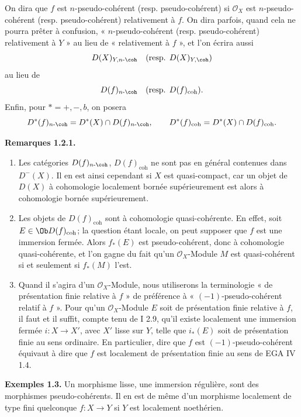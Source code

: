 \documentclass[11pt]{article}
\begin{document}
On dira que \(f\) est \(n\)-pseudo-cohérent (resp. pseudo-cohérent) si \(\mathcal O_X\) est \(n\)-pseudo-cohérent (resp. pseudo-cohérent) relativement à \(f\). On dira parfois, quand cela ne pourra prêter à confusion, « \(n\)-pseudo-cohérent (resp. pseudo-cohérent) relativement à \(Y\) » au lieu de « relativement à \(f\) », et l'on écrira aussi
\[
  D(X)_{Y,n\text{-}\coh}\quad(\text{resp. }D(X)_{Y,\coh})
\]
au lieu de
\[
  D(f)_{n\text{-}\coh}\quad(\text{resp. }D(f)_{\mathrm{coh}}).
\]
Enfin, pour \(*=+,-,b\), on posera
\[
  D^*(f)_{n\text{-}\coh}=D^*(X)\cap D(f)_{n\text{-}\coh},
  \qquad
  D^*(f)_{\mathrm{coh}}=D^*(X)\cap D(f)_{\mathrm{coh}}.
\]

\textbf{Remarques 1.2.1.}
\begin{enumerate}[label=\alph*)]
\item Les catégories \(D(f)_{n\text{-}\coh}\), \(D(f)_{\mathrm{coh}}\) ne sont pas en général contenues dans \(D^{-}(X)\). Il en est ainsi cependant si \(X\) est quasi-compact, car un objet de \(D(X)\) à cohomologie localement bornée supérieurement est alors à cohomologie bornée supérieurement.

\item Les objets de \(D(f)_{\mathrm{coh}}\) sont à cohomologie quasi-cohérente. En effet, soit \(E\in\Ob D(f)_{\mathrm{coh}}\); la question étant locale, on peut supposer que \(f\) est une immersion fermée. Alors \(f_*(E)\) est pseudo-cohérent, donc à cohomologie quasi-cohérente, et l'on gagne du fait qu'un \(\mathcal O_X\)-Module \(M\) est quasi-cohérent si et seulement si \(f_*(M)\) l'est.

\item Quand il s'agira d'un \(\mathcal O_X\)-Module, nous utiliserons la terminologie « de présentation finie relative à \(f\) » de préférence à « \((-1)\)-pseudo-cohérent relatif à \(f\) ». Pour qu'un \(\mathcal O_X\)-Module \(E\) soit de présentation finie relative à \(f\), il faut et il suffit, compte tenu de I 2.9, qu'il existe localement une immersion fermée \(i:X\to X'\), avec \(X'\) lisse sur \(Y\), telle que \(i_*(E)\) soit de présentation finie au sens ordinaire. En particulier, dire que \(f\) est \((-1)\)-pseudo-cohérent équivaut à dire que \(f\) est localement de présentation finie au sens de EGA IV 1.4.
\end{enumerate}

\textbf{Exemples 1.3.} Un morphisme lisse, une immersion régulière, sont des morphismes pseudo-cohérents. Il en est de même d'un morphisme localement de type fini quelconque \(f:X\to Y\) si \(Y\) est localement noethérien.
\end{document}
